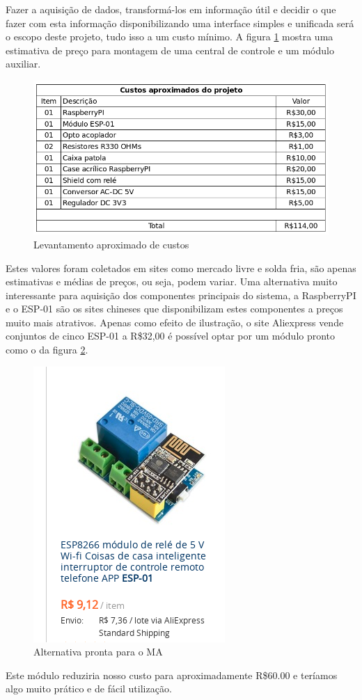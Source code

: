 Fazer a aquisição de dados, transformá-los em informação útil e decidir o que fazer com esta informação disponibilizando uma interface simples e unificada será o escopo deste projeto, tudo isso a um custo mínimo. A figura \ref{custos} mostra uma estimativa de preço para montagem de uma central de controle e um módulo auxiliar.

\begin{figure}[H]
\caption{\label{custos} Levantamento aproximado de custos}
\includegraphics[scale=0.4]{img/custos.png}
\end{figure}

Estes valores foram coletados em sites como mercado livre e solda fria, são apenas estimativas e médias de preços, ou seja, podem variar. Uma alternativa muito interessante para aquisição dos componentes principais do sistema, a RaspberryPI e o ESP-01 são os sites chineses que disponibilizam estes componentes a preços muito mais atrativos. Apenas como efeito de ilustração, o site Aliexpress vende conjuntos de cinco ESP-01 a R\$32,00 é possível optar por um módulo pronto como o da figura \ref{modulo-ali}.

\begin{figure}[H]
\caption{\label{modulo-ali} Alternativa pronta para o MA}
\includegraphics[scale=0.4]{img/modulo-ali.png}
\end{figure}

Este módulo reduziria nosso custo para aproximadamente R\$60.00 e teríamos algo muito prático e de fácil utilização.


